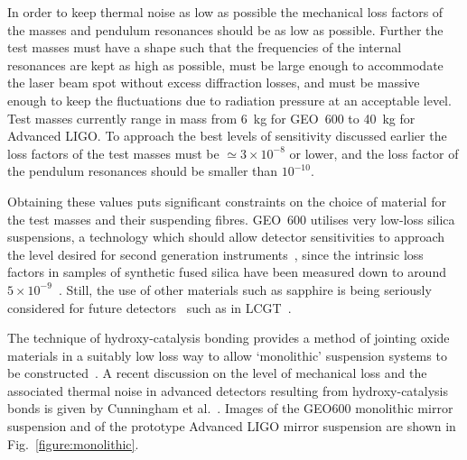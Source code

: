 \documentclass{article}
\begin{document}
In order to keep thermal noise as low as possible the mechanical loss factors of
the masses and pendulum resonances should be as low as possible. Further the
test masses must have a shape such that the frequencies of the internal
resonances are kept as high as possible, must be large enough to accommodate the
laser beam spot without excess diffraction losses, and must be massive enough to
keep the fluctuations due to radiation pressure at an acceptable level. Test
masses currently range in mass from 6~kg for GEO~600 to 40~kg for Advanced LIGO.
To approach the best levels of sensitivity discussed earlier the loss factors of
the test masses must be $\simeq 3 \times 10^{-8}$ or lower, and the loss factor
of the pendulum resonances should be smaller than $10^{-10}$.

Obtaining these values puts significant constraints on the choice of material
for the test masses and their suspending fibres. GEO~600 utilises very low-loss
silica suspensions, a technology which should allow detector sensitivities to
approach the level desired for second generation instruments~\cite{Braginsky1,
Rowan1, Rowan2}, since the intrinsic loss factors in samples of synthetic fused
silica have been measured down to around $5\times 10^{-9}$~\cite{Ageev:2004}.
Still, the use of other materials such as sapphire is being seriously considered
for future detectors~\cite{Braginsky2, Ju2, Rowan1} such as in
LCGT~\cite{Miyoki:2005, Ohashi:2008}. 

The technique of hydroxy-catalysis bonding provides a method of jointing oxide
materials in a suitably low loss way to allow `monolithic' suspension systems to
be constructed~\cite{Rowan3}. A recent discussion on the level of mechanical
loss and the associated thermal noise in advanced detectors resulting from
hydroxy-catalysis bonds is given by Cunningham et al.~\cite{Cunningham:2010}.
Images of the GEO600 monolithic mirror suspension and of the prototype Advanced
LIGO mirror suspension are shown in Fig.~\ref{figure:monolithic}.

\end{document}
